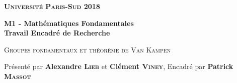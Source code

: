 \documentclass{article}[a4paper, twoside]
\begin{document}
	\onehalfspacing %
	
	\theoremstyle{plain}
	\newtheorem{theo}{Théorème}
	\newtheorem{prop}{Proposition}
	\newtheorem{coro}{Corollaire}
	\newtheorem*{lemm}{Lemme}
	
	\theoremstyle{definition}
	\newtheorem{defi}{Définition}
	
    \begin{titlepage}
		\thispagestyle{empty}
		\vspace*{2cm}
		{\Huge\bf \textsc{Université Paris-Sud} \hfill 2018}
		\vspace*{2cm}
		\begin{center}
			{\LARGE\bf M1 - Mathématiques Fondamentales\\
			Travail Encadré de Recherche\par
			\vspace*{4cm}
			\textsc{Groupes fondamentaux et théorème de Van Kampen}}
		\end{center}
		\vspace*{8cm}
		{\Large Présenté par \textbf{Alexandre \textsc{Lieb}} et \textbf{Clément \textsc{Viney}}, 
		\hfill Encadré par \textbf{Patrick \textsc{Massot}}}
	\end{titlepage}
	
	\renewcommand{\contentsname}{Sommaire}
	\setcounter{tocdepth}{1}
	\tableofcontents
	\newpage{}
	
	
	
	
	
	
\end{document}
